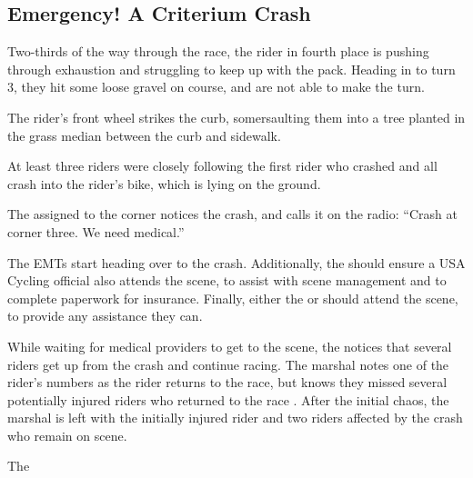 \subsection[Criterium Crash]{Emergency! A Criterium Crash}

Two-thirds of the way through the race, the rider in fourth place is pushing through exhaustion and struggling to keep up with the pack.
Heading in to turn 3, they hit some loose gravel on course, and are not able to make the turn.

The rider's front wheel strikes the curb, somersaulting them into a tree planted in the grass median between the curb and sidewalk.

At least three riders were closely following the first rider who crashed and all crash into the rider's bike, which is lying on the ground.

The  assigned to the corner notices the crash, and calls it on the radio:
``Crash at corner three.  We need medical.''

The  EMTs start heading over to the crash.
Additionally, the  should ensure a USA Cycling official also attends the scene, to assist with scene management and to complete paperwork
for insurance.
Finally, either the  or  should attend the scene, to provide any assistance they can.

While waiting for medical providers to get to the scene,
the  notices that several riders get up from the crash and continue racing.
The marshal notes one of the rider's numbers as the rider returns to the race,
but knows they missed several potentially injured riders who returned to the race%
.
After the initial chaos, the marshal is left with the initially injured rider and two riders affected by the crash who remain on scene.

The 

